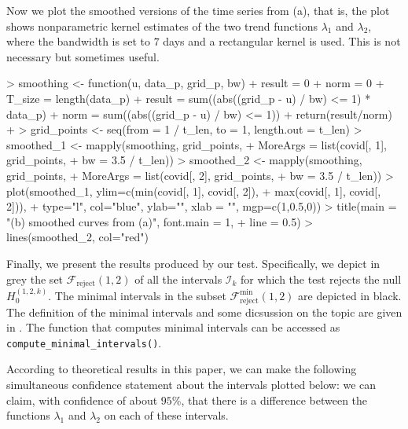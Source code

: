 \documentclass[a4paper]{scrartcl}
\begin{document}
Now we plot the smoothed versions of the time series from (a), that is, the plot shows nonparametric kernel estimates of the two trend functions $\lambda_1$ and $\lambda_2$, where the bandwidth is set to $7$ days and a rectangular kernel is used. This is not necessary but sometimes useful.
\begin{Schunk}
\begin{Sinput}
> smoothing <- function(u, data_p, grid_p, bw){
+   result      = 0
+   norm        = 0
+   T_size      = length(data_p)
+   result = sum((abs((grid_p - u) / bw) <= 1) * data_p)
+   norm = sum((abs((grid_p - u) / bw) <= 1))
+   return(result/norm)
+ }
> grid_points <- seq(from = 1 / t_len, to = 1, length.out = t_len)
> smoothed_1  <- mapply(smoothing, grid_points,
+                       MoreArgs = list(covid[, 1], grid_points,
+                                       bw = 3.5 / t_len))
> smoothed_2  <- mapply(smoothing, grid_points,
+                       MoreArgs = list(covid[, 2], grid_points,
+                                       bw = 3.5 / t_len))
> plot(smoothed_1, ylim=c(min(covid[, 1], covid[, 2]),
+                         max(covid[, 1], covid[, 2])),
+      type="l", col="blue", ylab="", xlab = "", mgp=c(1,0.5,0))
> title(main = "(b) smoothed curves from (a)", font.main = 1,
+       line = 0.5)
> lines(smoothed_2, col="red")
\end{Sinput}
\end{Schunk}

Finally, we present the results produced by our test. Specifically, we depict in grey the set $\mathcal{F}_{\text{reject}}(1,2)$ of all the intervals $\mathcal{I}_k$ for which the test rejects the null $H_0^{(1, 2, k)}$. The minimal intervals in the subset $\mathcal{F}_{\text{reject}}^{\text{min}}(1, 2)$ are depicted in black. The definition of the minimal intervals and some dicsussion on the topic are given in \cite{KhismatullinaVogt2023}. The function that computes minimal intervals can be accessed as \verb|compute_minimal_intervals()|.

According to theoretical results in this paper, we can make the following simultaneous confidence statement about the intervals plotted below: we can claim, with confidence of about $95\%$, that there is a difference between the functions $\lambda_1$ and $\lambda_2$ on each of these intervals.
\end{document}
